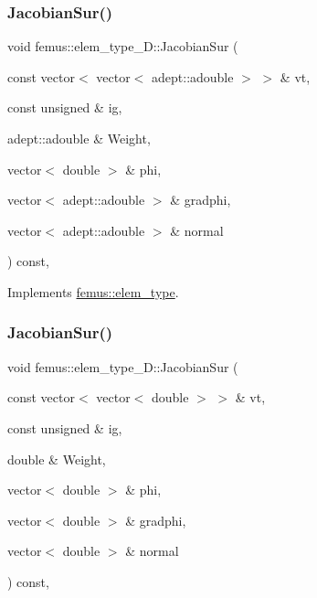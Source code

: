 \mbox{\label{classfemus_1_1elem__type__2_d_af19f0963ef176d7a3b4180730ef028c9}} 
\subsubsection{\texorpdfstring{Jacobian\+Sur()}{JacobianSur()}\hspace{0.1cm}{\footnotesize\ttfamily [1/2]}}
{\footnotesize\ttfamily void femus\+::elem\+\_\+type\+\_\+D\+::\+Jacobian\+Sur (\begin{DoxyParamCaption}\item[{const vector$<$ vector$<$ adept\+::adouble $>$ $>$ \&}]{vt,  }\item[{const unsigned \&}]{ig,  }\item[{adept\+::adouble \&}]{Weight,  }\item[{vector$<$ double $>$ \&}]{phi,  }\item[{vector$<$ adept\+::adouble $>$ \&}]{gradphi,  }\item[{vector$<$ adept\+::adouble $>$ \&}]{normal }\end{DoxyParamCaption}) const\hspace{0.3cm}{\ttfamily [inline]}, {\ttfamily [virtual]}}



Implements \mbox{\hyperlink{classfemus_1_1elem__type_a293052fac0f51472150b1bf7365c6b18}{femus\+::elem\+\_\+type}}.

\mbox{\label{classfemus_1_1elem__type__2_d_a6da2427389820a069cc62fa014262c44}} 
\subsubsection{\texorpdfstring{Jacobian\+Sur()}{JacobianSur()}\hspace{0.1cm}{\footnotesize\ttfamily [2/2]}}
{\footnotesize\ttfamily void femus\+::elem\+\_\+type\+\_\+D\+::\+Jacobian\+Sur (\begin{DoxyParamCaption}\item[{const vector$<$ vector$<$ double $>$ $>$ \&}]{vt,  }\item[{const unsigned \&}]{ig,  }\item[{double \&}]{Weight,  }\item[{vector$<$ double $>$ \&}]{phi,  }\item[{vector$<$ double $>$ \&}]{gradphi,  }\item[{vector$<$ double $>$ \&}]{normal }\end{DoxyParamCaption}) const\hspace{0.3cm}{\ttfamily [inline]}, {\ttfamily [virtual]}}



